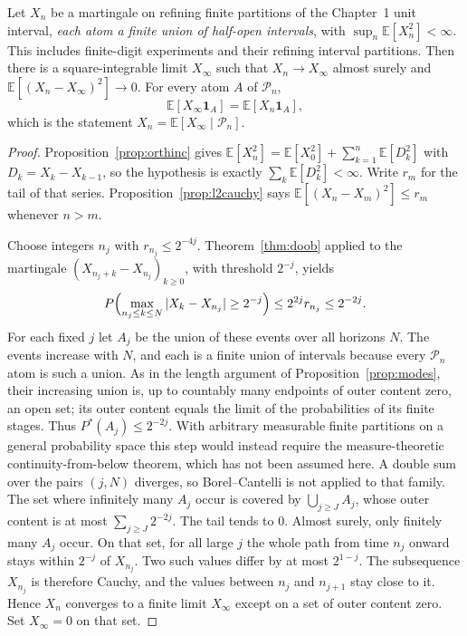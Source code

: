 \begin{theorem}[$L^2$ convergence]\label{thm:L2conv}
Let $X_n$ be a martingale on refining finite partitions of the Chapter~1 unit interval, \emph{each atom a finite union of half-open intervals}, with $\sup_n\mathbb E[X_n^2]<\infty$. This includes finite-digit experiments and their refining interval partitions. Then there is a square-integrable limit $X_\infty$ such that $X_n\to X_\infty$ almost surely and $\mathbb E[(X_n-X_\infty)^2]\to 0$. For every atom $A$ of $\mathcal P_n$,
\[
 \mathbb E[X_\infty\mathbf 1_A]=\mathbb E[X_n\mathbf 1_A],
\]
which is the statement $X_n=\mathbb E[X_\infty\mid\mathcal P_n]$.
\end{theorem}
\begin{proof}
Proposition~\ref{prop:orthinc} gives $\mathbb E[X_n^2]=\mathbb E[X_0^2]+\sum_{k=1}^n\mathbb E[D_k^2]$ with $D_k=X_k-X_{k-1}$, so the hypothesis is exactly $\sum_k\mathbb E[D_k^2]<\infty$. Write $r_m$ for the tail of that series. Proposition~\ref{prop:l2cauchy} says $\mathbb E[(X_n-X_m)^2]\le r_m$ whenever $n>m$.

Choose integers $n_j$ with $r_{n_j}\le 2^{-4j}$. Theorem~\ref{thm:doob} applied to the martingale $(X_{n_j+k}-X_{n_j})_{k\ge0}$, with threshold $2^{-j}$, yields
\[
 P\Bigl(\max_{n_j\le k\le N}|X_k-X_{n_j}|\ge 2^{-j}\Bigr)\le 2^{2j}r_{n_j}\le 2^{-2j}.
\]
For each fixed $j$ let $A_j$ be the union of these events over all horizons $N$. The events increase with $N$, and each is a finite union of intervals because every $\mathcal P_n$ atom is such a union. As in the length argument of Proposition~\ref{prop:modes}, their increasing union is, up to countably many endpoints of outer content zero, an open set; its outer content equals the limit of the probabilities of its finite stages. Thus $P^*(A_j)\le2^{-2j}$. With arbitrary measurable finite partitions on a general probability space this step would instead require the measure-theoretic continuity-from-below theorem, which has not been assumed here. A double sum over the pairs $(j,N)$ diverges, so Borel--Cantelli is not applied to that family. The set where infinitely many $A_j$ occur is covered by $\bigcup_{j\ge J}A_j$, whose outer content is at most $\sum_{j\ge J}2^{-2j}$. The tail tends to $0$. Almost surely, only finitely many $A_j$ occur. On that set, for all large $j$ the whole path from time $n_j$ onward stays within $2^{-j}$ of $X_{n_j}$. Two such values differ by at most $2^{1-j}$. The subsequence $X_{n_j}$ is therefore Cauchy, and the values between $n_j$ and $n_{j+1}$ stay close to it. Hence $X_n$ converges to a finite limit $X_\infty$ except on a set of outer content zero. Set $X_\infty=0$ on that set.


\end{proof}
